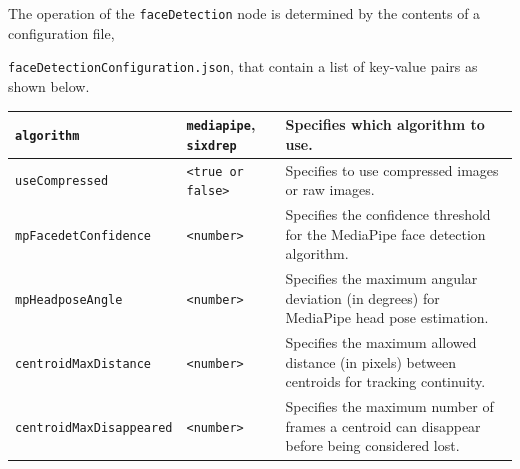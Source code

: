 \documentclass{CSSRforAfrica}
\begin{document}
The operation of the {\small \verb+faceDetection+} node is determined by the contents of a configuration file, {\small \texttt{faceDetectionConfiguration.json}, that  contain a list of key-value pairs as shown below.  

\begin{center}
\begin{tabularx}{\linewidth}{| l | l | X|}
\hline
{\footnotesize \texttt{algorithm} }  & {\footnotesize \texttt{mediapipe}, \texttt{sixdrep}}   & {\small Specifies which algorithm to use.} \\
\hline
{\footnotesize \texttt{useCompressed} }  & {\footnotesize \texttt{<true or false>}}     & {\small Specifies to use compressed images or raw images.} \\
\hline
{\footnotesize \texttt{mpFacedetConfidence} }  & {\footnotesize \texttt{<number>}}     & {\small Specifies the confidence threshold for the MediaPipe face detection algorithm.} \\
\hline
{\footnotesize \texttt{mpHeadposeAngle} }  & {\footnotesize \texttt{<number>}}     & {\small Specifies the maximum angular deviation (in degrees) for MediaPipe head pose estimation.} \\
\hline
{\footnotesize \texttt{centroidMaxDistance} }  & {\footnotesize \texttt{<number>}}     & {\small Specifies the maximum allowed distance (in pixels) between centroids for tracking continuity.} \\
\hline
{\footnotesize \texttt{centroidMaxDisappeared} }  & {\footnotesize \texttt{<number>}}     & {\small Specifies the maximum number of frames a centroid can disappear before being considered lost.} \\

\end{tabularx}
\end{center}}
\end{document}
